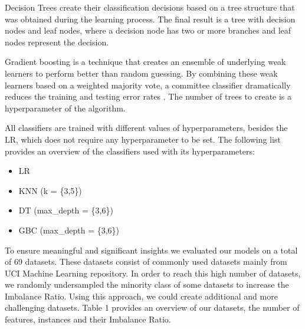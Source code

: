 \documentclass[parskip=full]{scrartcl}
\begin{document}
Decision Trees create their classification decisions based on a tree structure that was obtained during the learning process. The final result is a tree with decision nodes and leaf nodes, where a decision node has two or more branches and leaf nodes represent the decision.

Gradient boosting is a technique that creates an ensemble of underlying weak learners to perform better than random guessing. By combining these weak learners based on a weighted majority vote, a committee classifier dramatically reduces the training and testing error rates  \cite{Huang2007}. The number of trees to create is a hyperparameter of the algorithm.

All classifiers are trained with different values of hyperparameters, besides the LR, which does not require any hyperparameter to be set. The following list provides an overview of the classifiers used with its hyperparameters:

\begin{itemize}
  \item LR
  \item KNN (k = \{3,5\})
  \item DT (max\_depth = \{3,6\})
  \item GBC (max\_depth = \{3,6\})
\end{itemize}

To ensure meaningful and significant insights we evaluated our models on a total of 69 datasets. These datasets consist of commonly used datasets mainly from UCI Machine Learning repository. In order to reach this high number of datasets, we randomly undersampled the minority class of some datasets to increase the Imbalance Ratio. Using this approach, we could create additional and more challenging datasets. Table 1 provides an overview of our datasets, the number of features, instances and their Imbalance Ratio.
\end{document}
